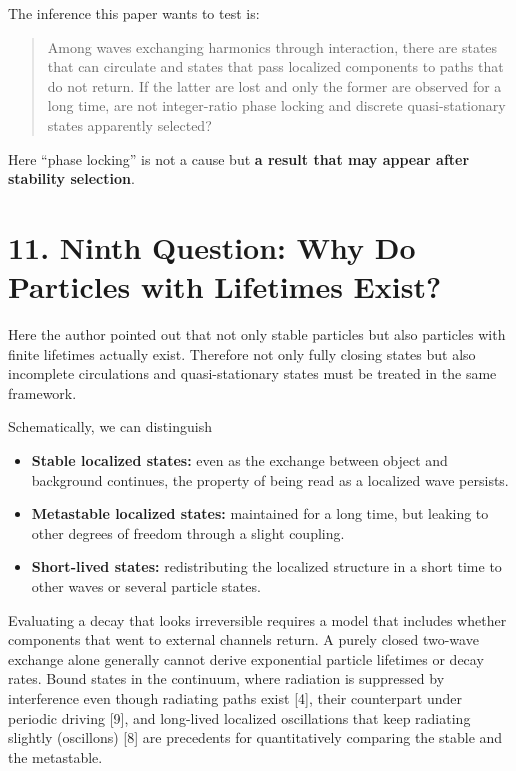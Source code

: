 \documentclass[
  a4paper,
]{article}
\providecommand{\tightlist}{%
  \setlength{\itemsep}{0pt}\setlength{\parskip}{0pt}}
\begin{document}
The inference this paper wants to test is:

\begin{quote}
Among waves exchanging harmonics through interaction, there are states
that can circulate and states that pass localized components to paths
that do not return. If the latter are lost and only the former are
observed for a long time, are not integer-ratio phase locking and
discrete quasi-stationary states apparently selected?
\end{quote}

Here ``phase locking'' is not a cause but \textbf{a result that may
appear after stability selection}.

\section{11. Ninth Question: Why Do Particles with Lifetimes
Exist?}\label{ninth-question-why-do-particles-with-lifetimes-exist}

Here the author pointed out that not only stable particles but also
particles with finite lifetimes actually exist. Therefore not only fully
closing states but also incomplete circulations and quasi-stationary
states must be treated in the same framework.

Schematically, we can distinguish

\begin{itemize}
\tightlist
\item
  \textbf{Stable localized states:} even as the exchange between object
  and background continues, the property of being read as a localized
  wave persists.
\item
  \textbf{Metastable localized states:} maintained for a long time, but
  leaking to other degrees of freedom through a slight coupling.
\item
  \textbf{Short-lived states:} redistributing the localized structure in
  a short time to other waves or several particle states.
\end{itemize}

Evaluating a decay that looks irreversible requires a model that
includes whether components that went to external channels return. A
purely closed two-wave exchange alone generally cannot derive
exponential particle lifetimes or decay rates. Bound states in the
continuum, where radiation is suppressed by interference even though
radiating paths exist {[}4{]}, their counterpart under periodic driving
{[}9{]}, and long-lived localized oscillations that keep radiating
slightly (oscillons) {[}8{]} are precedents for quantitatively comparing
the stable and the metastable.
\end{document}
